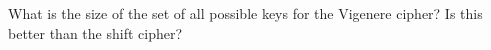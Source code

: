   What is the size of the set of all possible keys for the Vigenere cipher?
  Is this better than the shift cipher?
